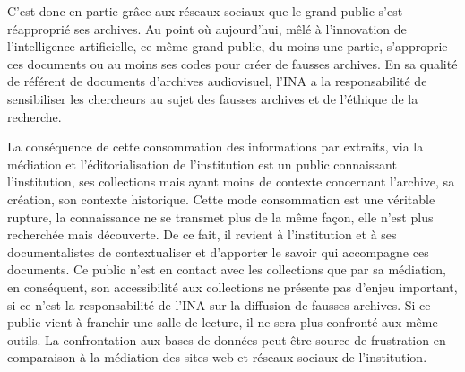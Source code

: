 C'est donc en partie grâce aux réseaux sociaux que le grand public s'est réapproprié ses archives. Au point où aujourd'hui, mêlé à l'innovation de l'intelligence artificielle, ce même grand public, du moins une partie, s'approprie ces documents ou au moins ses codes pour créer de fausses archives. En sa qualité de référent de documents d'archives audiovisuel, l'INA a la responsabilité de sensibiliser les chercheurs au sujet des fausses archives et de l'éthique de la recherche. 


La conséquence de cette consommation des informations par extraits, via la médiation et l'éditorialisation de l'institution est un public connaissant l'institution, ses collections mais ayant moins de contexte concernant l'archive, sa création, son contexte historique. Cette mode consommation est une véritable rupture, la connaissance ne se transmet plus de la même façon, elle n'est plus recherchée mais découverte. De ce fait, il revient à l'institution et à ses documentalistes de contextualiser et d'apporter le savoir qui accompagne ces documents. Ce public n'est en contact avec les collections que par sa médiation, en conséquent, son accessibilité aux collections ne présente pas d'enjeu important, si ce n'est la responsabilité de l'INA sur la diffusion de fausses archives. Si ce public vient à franchir une salle de lecture, il ne sera plus confronté aux même outils. La confrontation aux bases de données peut être source de frustration en comparaison à la médiation des sites web et réseaux sociaux de l'institution. 